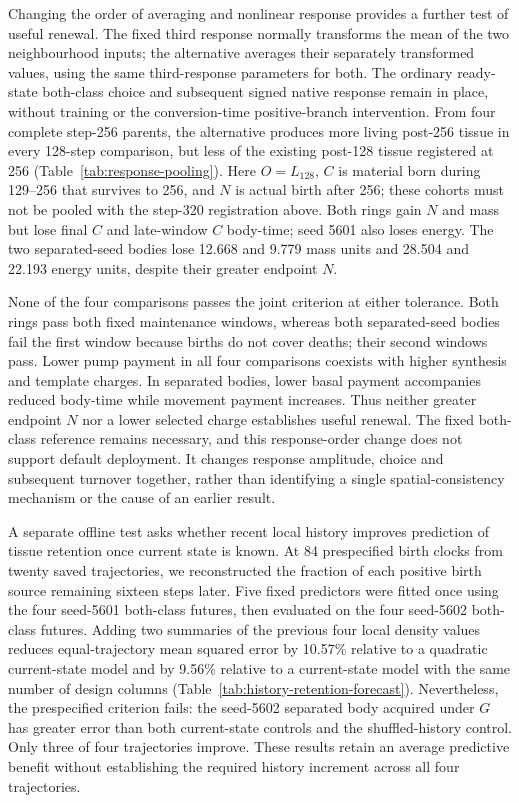 

Changing the order of averaging and nonlinear response provides a further test of useful renewal. The fixed third response normally transforms the mean of the two neighbourhood inputs; the alternative averages their separately transformed values, using the same third-response parameters for both. The ordinary ready-state both-class choice and subsequent signed native response remain in place, without training or the conversion-time positive-branch intervention. From four complete step-256 parents, the alternative produces more living post-256 tissue in every 128-step comparison, but less of the existing post-128 tissue registered at 256 (Table~\ref{tab:response-pooling}). Here $O=L_{128}$, $C$ is material born during 129--256 that survives to 256, and $N$ is actual birth after 256; these cohorts must not be pooled with the step-320 registration above. Both rings gain $N$ and mass but lose final $C$ and late-window $C$ body-time; seed 5601 also loses energy. The two separated-seed bodies lose 12.668 and 9.779 mass units and 28.504 and 22.193 energy units, despite their greater endpoint $N$.

None of the four comparisons passes the joint criterion at either tolerance. Both rings pass both fixed maintenance windows, whereas both separated-seed bodies fail the first window because births do not cover deaths; their second windows pass. Lower pump payment in all four comparisons coexists with higher synthesis and template charges. In separated bodies, lower basal payment accompanies reduced body-time while movement payment increases. Thus neither greater endpoint $N$ nor a lower selected charge establishes useful renewal. The fixed both-class reference remains necessary, and this response-order change does not support default deployment. It changes response amplitude, choice and subsequent turnover together, rather than identifying a single spatial-consistency mechanism or the cause of an earlier result.



A separate offline test asks whether recent local history improves prediction of tissue retention once current state is known. At 84 prespecified birth clocks from twenty saved trajectories, we reconstructed the fraction of each positive birth source remaining sixteen steps later. Five fixed predictors were fitted once using the four seed-5601 both-class futures, then evaluated on the four seed-5602 both-class futures. Adding two summaries of the previous four local density values reduces equal-trajectory mean squared error by 10.57\% relative to a quadratic current-state model and by 9.56\% relative to a current-state model with the same number of design columns (Table~\ref{tab:history-retention-forecast}). Nevertheless, the prespecified criterion fails: the seed-5602 separated body acquired under $G$ has greater error than both current-state controls and the shuffled-history control. Only three of four trajectories improve. These results retain an average predictive benefit without establishing the required history increment across all four trajectories.

